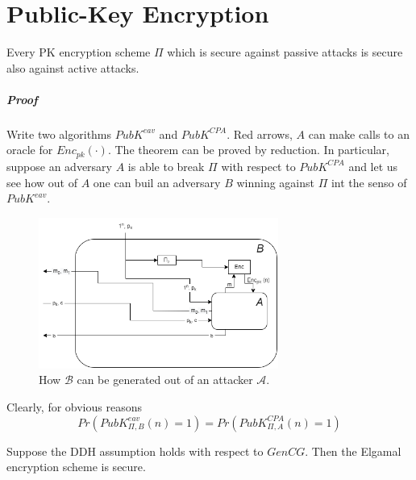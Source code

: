 \documentclass[../main]{subfiles}
\begin{document}
\chapter{Public-Key Encryption}

\begin{theorem}
    Every PK encryption scheme $\Pi$ which is secure against passive attacks is secure also against active attacks.
\end{theorem}

\paragraph{Proof}
    Write two algorithms $PubK^{eav}$ and $PubK^{CPA}$.
    Red arrows, $A$ can make calls to an oracle for $Enc_{pk}(\cdot)$.
    The theorem can be proved by reduction.
    In particular, suppose an adversary $A$ is able to break $\Pi$ with respect to $PubK^{CPA}$ and let us see how out of $A$ one can
    buil an adversary $B$ winning against $\Pi$ int the senso of $PubK^{eav}$.
    \begin{figure}[H]
        \centering
        \includegraphics[width=0.7\textwidth]{images/security_of_public_key_passive_attacks}
        \caption{How $\mathcal{B}$ can be generated out of an attacker $\mathcal{A}.$}
    \end{figure}
    Clearly, for obvious reasons
    $$Pr(PubK^{eav}_{\Pi, B}(n) = 1) = Pr(PubK^{CPA}_{\Pi, A}(n) = 1)$$

\begin{theorem}
    Suppose the DDH assumption holds with respect to $GenCG$.
    Then the Elgamal encryption scheme is secure. %
\end{theorem}
\end{document}
